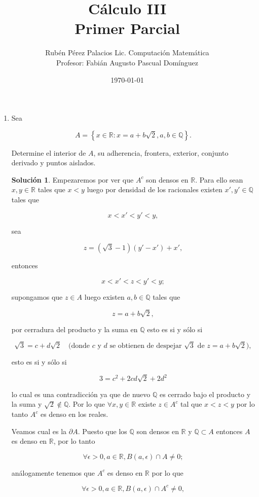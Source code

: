 \documentclass[letterpaper]{article}
\title{Cálculo III \\ Primer Parcial}
\author{Rubén Pérez Palacios Lic. Computación Matemática\\Profesor: Fabián Augusto Pascual Domínguez}
\date{\today}
\theoremstyle{definition}
\theoremstyle{lemathm}
\theoremstyle{lemathm}
\newtheorem{sol}{Solución}
\theoremstyle{lemathm}
\theoremstyle{lemademthm}
\newcommand{\pars}[1]{\left( #1 \right) }
\newcommand{\set}[1]{\left \{ #1 \right\} }
\newcommand{\QQ}{\mathbb{Q}}
\newcommand{\RR}{\mathbb{R}}
\newcommand{\1}{\mathbbm{1}}
\begin{document}
	\maketitle

	\begin{enumerate}

		\item Sea
		
		\[A = \set{x\in\RR : x = a + b\sqrt{2}, a,b\in\QQ}.\]

		Determine el interior de $A$, su adherencia, frontera, exterior, conjunto derivado y puntos aislados.

		\begin{sol}
			Empezaremos por ver que $A^c$ son densos en $\RR$. Para ello sean $x,y\in \RR$ tales que $x < y$ luego por densidad de los racionales existen $x',y'\in\QQ$ tales que 
			
			\[x < x' < y' < y,\]
			
			sea 
			
			\[z = \pars{\sqrt{3}-1}\pars{y'-x'} + x',\]
			
			entonces 
			
			\[x < x' < z < y' < y;\]
			
			supongamos que $z \in A$ luego existen $a,b\in\QQ$ tales que 
			
			\[z = a + b\sqrt{2},\]
			
			por cerradura del producto y la suma en $\QQ$ esto es si y sólo si 
			
			\[\sqrt{3} = c + d\sqrt{2} \quad\text{(donde $c$ y $d$ se obtienen de despejar $\sqrt{3}$ de $z = a + b\sqrt{2}$)},\]
			
			esto es si y sólo si 
			
			\[3 = c^2 + 2cd\sqrt{2} + 2d^2\]
			
			lo cual es una contradicción ya que de nuevo $\QQ$ es cerrado bajo el producto y la suma y $\sqrt{2}\not\in\QQ$. Por lo que $\forall x,y\in\RR$ existe $z\in A^c$ tal que $x<z<y$ por lo tanto $A^c$ es denso en los reales.

			\newpage

			Veamos cual es la $\partial A$. Puesto que los $\QQ$ son densos en $\RR$ y $\QQ \subset A$ entonces $A$ es denso en $\RR$, por lo tanto
			
			\[\forall \epsilon > 0, a\in \RR, B\pars{a,\epsilon}\cap A \neq 0;\]
			
			análogamente tenemos que $A^c$ es  denso en $\RR$ por lo que 
			
			\[\forall \epsilon > 0, a\in \RR, B\pars{a,\epsilon}\cap A^c \neq 0,\]
			

\end{sol}
\end{enumerate}
\end{document}
